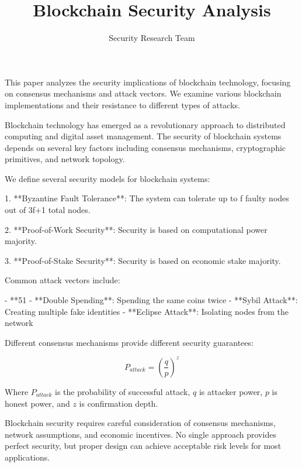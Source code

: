 \documentclass{article}
\title{Blockchain Security Analysis}
\author{Security Research Team}
\date{}
\begin{document}
\maketitle

This paper analyzes the security implications of blockchain technology, focusing on consensus mechanisms and attack vectors. We examine various blockchain implementations and their resistance to different types of attacks.

Blockchain technology has emerged as a revolutionary approach to distributed computing and digital asset management. The security of blockchain systems depends on several key factors including consensus mechanisms, cryptographic primitives, and network topology.

We define several security models for blockchain systems:

1. **Byzantine Fault Tolerance**: The system can tolerate up to f faulty nodes out of 3f+1 total nodes.

2. **Proof-of-Work Security**: Security is based on computational power majority.

3. **Proof-of-Stake Security**: Security is based on economic stake majority.

Common attack vectors include:

- **51%
- **Double Spending**: Spending the same coins twice
- **Sybil Attack**: Creating multiple fake identities
- **Eclipse Attack**: Isolating nodes from the network

Different consensus mechanisms provide different security guarantees:

\begin{equation}
P_{attack} = \left(\frac{q}{p}\right)^z
\end{equation}

Where $P_{attack}$ is the probability of successful attack, $q$ is attacker power, $p$ is honest power, and $z$ is confirmation depth.

Blockchain security requires careful consideration of consensus mechanisms, network assumptions, and economic incentives. No single approach provides perfect security, but proper design can achieve acceptable risk levels for most applications.
\end{document}
